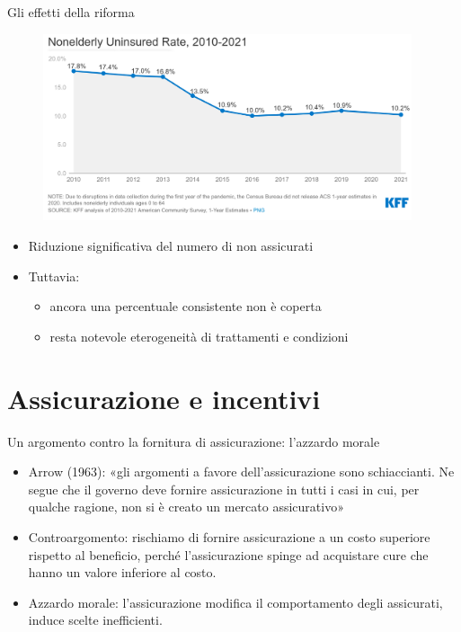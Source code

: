 \documentclass[aspectratio=64,12pt]{beamer}
\begin{document}
\begin{frame}{Gli effetti della riforma}
\begin{figure}[htbp]
\centering
\includegraphics[height=5.5cm]{./figure/nonelderly-uninsured-rate.png}
\end{figure}

\begin{itemize}
\item Riduzione significativa del numero di non assicurati
\item Tuttavia:
\begin{itemize}
\item ancora una percentuale consistente non è coperta
\item resta notevole eterogeneità di trattamenti e condizioni
\end{itemize}
\end{itemize}
\end{frame}

\section{Assicurazione e incentivi}

\begin{frame}{Un argomento contro la fornitura di assicurazione: l'azzardo morale}
\begin{itemize}
\item Arrow (1963): «gli argomenti a favore dell'assicurazione sono
schiaccianti. Ne segue che il governo deve fornire assicurazione in tutti i
casi in cui, per qualche ragione, non si è creato un mercato assicurativo»
\item Controargomento: rischiamo di fornire assicurazione a un costo superiore
rispetto al beneficio, perché l'assicurazione spinge ad acquistare cure che
hanno un valore inferiore al costo.
\item \alert{Azzardo morale}: l'assicurazione modifica il comportamento degli
assicurati, induce scelte inefficienti.
\end{itemize}
\end{frame}
\end{document}

